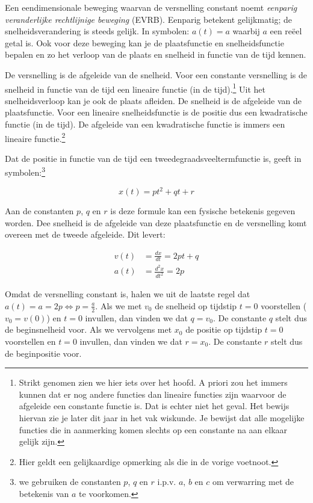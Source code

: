 \documentclass{ximera}
\begin{document}
	\author{Bart Lambregs}
    \xmsource\xmuitleg




Een eendimensionale beweging waarvan de versnelling constant noemt  \textit{eenparig veranderlijke rechtlijnige be\-we\-ging} (EVRB). Eenparig betekent gelijkmatig; de snelheidsverandering is steeds gelijk. In symbolen: $a(t)=a$ waarbij $a$ een reëel getal is. Ook voor deze beweging kan je de plaatsfunctie en snelheidsfunctie bepalen en zo het verloop van de plaats en snelheid in functie van de tijd kennen. 

De versnelling is de afgeleide van de snelheid. Voor een constante versnelling is de snelheid in functie van de tijd een lineaire functie (in de tijd).\footnote{Strikt genomen zien we hier iets over het hoofd. A priori zou het immers kunnen dat er nog andere functies dan lineaire functies zijn waarvoor de afgeleide een constante functie is. Dat is echter niet het geval. Het bewijs hiervan zie je later dit jaar in het vak wiskunde. Je bewijst dat alle mogelijke functies die in aanmerking komen slechts op een constante na aan elkaar gelijk zijn.} Uit het snelheidsverloop kan je ook de plaats afleiden. De snelheid is de afgeleide van de plaatsfunctie. Voor een lineaire snelheidsfunctie is de positie dus een kwadratische functie (in de tijd). De afgeleide van een kwadratische functie is immers een lineaire functie.\footnote{Hier geldt een gelijkaardige opmerking als die in de vorige voetnoot.}

Dat de positie in functie van de tijd een tweedegraadsveeltermfunctie is, geeft in symbolen:\footnote{we gebruiken de constanten $p$, $q$ en $r$ i.p.v. $a$, $b$ en $c$ om verwarring met de betekenis van $a$ te voorkomen.}

\[
x(t)=pt^2+qt+r
\]

Aan de constanten $p$, $q$ en $r$ is deze formule kan een fysische betekenis gegeven worden. Dee snelheid is de afgeleide van deze plaatsfunctie en de versnelling komt overeen met de tweede afgeleide. Dit levert: 

\[
\begin{array}{rl}
v(t)&=\frac{dx}{dt}=2pt+q\\
a(t)&=\frac{d^2x}{dt^2}=2p%
\end{array}
\]

Omdat de versnelling constant is, halen we uit de laatste regel dat $a(t)=a=2p\Leftrightarrow p=\frac{a}{2}$. Als we met $v_0$ de snelheid op tijdstip $t=0$ voorstellen ($v_0=v(0)$) en $t=0$ invullen, dan vinden we dat $q=v_0$. De constante $q$ stelt dus de beginsnelheid voor. Als we vervolgens met $x_0$ de positie op tijdstip $t=0$ voorstellen en $t=0$ invullen, dan vinden we dat $r=x_0$. De constante $r$ stelt dus de beginpositie voor.
\end{document}
